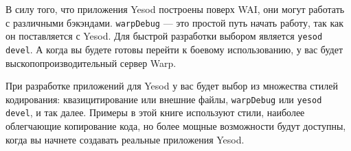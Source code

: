 В силу того, что приложения Yesod построены поверх WAI, они могут работать с различными
бэкэндами. \lstinline!warpDebug! --- это простой путь начать работу, так как он
поставляется с Yesod. Для быстрой разработки выбором является \lstinline!yesod devel!. А
когда вы будете готовы перейти к боевому использованию, у вас будет
выскопопроизводительный сервер Warp.

При разработке приложений для Yesod у вас будет выбор из множества стилей кодирования:
квазицитирование или внешние файлы, \lstinline{warpDebug} или \lstinline'yesod devel', и
так далее. Примеры в этой книге используют стили, наиболее облегчающие копирование кода,
но более мощные возможности будут доступны, когда вы начнете создавать реальные приложения
Yesod.
